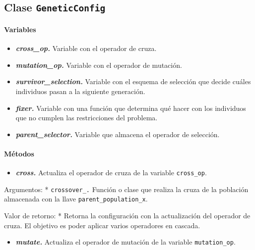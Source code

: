 \documentclass[11pt]{article}
\providecommand{\tightlist}{%
      \setlength{\itemsep}{0pt}\setlength{\parskip}{0pt}}
\begin{document}
    \subsection{\texorpdfstring{Clase
\texttt{GeneticConfig}}{Clase GeneticConfig}}\label{clase-geneticconfig}

\paragraph{Variables}\label{variables}

\begin{itemize}
\tightlist
\item
  \emph{\textbf{cross\_op.}} Variable con el operador de cruza.
\item
  \emph{\textbf{mutation\_op.}} Variable con el operador de mutación.
\item
  \emph{\textbf{survivor\_selection.}} Variable con el esquema de
  selección que decide cuáles individuos pasan a la siguiente
  generación.
\item
  \emph{\textbf{fixer.}} Variable con una función que determina qué
  hacer con los individuos que no cumplen las restricciones del
  problema.
\item
  \emph{\textbf{parent\_selector.}} Variable que almacena el operador de
  selección.
\end{itemize}

\paragraph{Métodos}\label{muxe9todos}

\begin{itemize}
\tightlist
\item
  \emph{\textbf{cross.}} Actualiza el operador de cruza de la variable
  \texttt{cross\_op}.
\end{itemize}

Argumentos: * \texttt{crossover\_.} Función o clase que realiza la cruza
de la población almacenada con la llave \texttt{parent\_population\_x}.

Valor de retorno: * Retorna la configuración con la actualización del
operador de cruza. El objetivo es poder aplicar varios operadores en
cascada.

\begin{itemize}
\tightlist
\item
  \emph{\textbf{mutate.}} Actualiza el operador de mutación de la
  variable \texttt{mutation\_op}.
\end{itemize}
\end{document}
